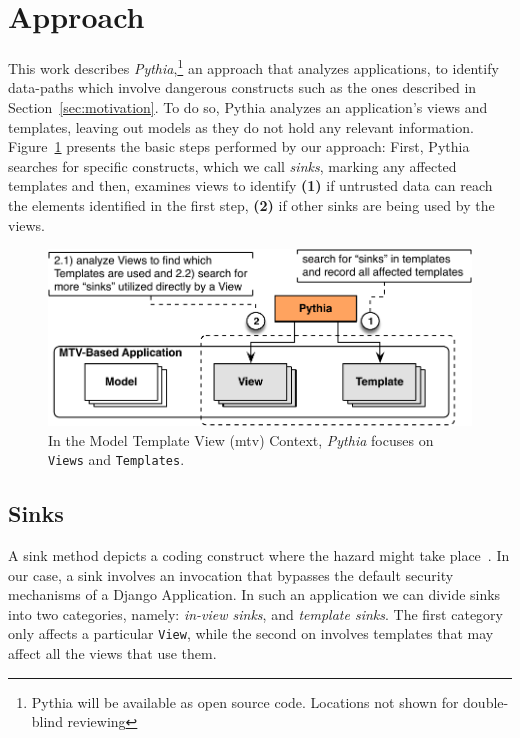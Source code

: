\section{Approach}
\label{sec:approach}

This work describes {\it Pythia},\footnote{Pythia
will be available as open source code.
Locations not shown for double-blind reviewing}
an approach that analyzes applications,
to identify data-paths
which involve dangerous constructs such
as the ones described in Section~\ref{sec:motivation}.
To do so,
Pythia analyzes an application's
views and templates,
leaving out models as they do not hold any relevant information.
Figure~\ref{fig:arch} presents the basic steps performed by our approach:
First,
Pythia searches for specific constructs,
which we call {\it sinks},
marking any affected templates and then,
examines views to identify
\textbf{(1)} if untrusted data can reach
the elements identified in the first step,
\textbf{(2)} if other sinks are being used by the views.

\begin{figure}[t]
    \begin{center}
        \includegraphics[scale=0.53]{MVC_and_Pythia_2.pdf}
        \caption{In the Model Template View ({\sc mtv}) Context, {\it Pythia} focuses on {\tt Views} and {\tt Templates}.}\label{fig:arch}
    \end{center}
\end{figure}

\subsection{Sinks}
\label{sec:sinks}

A sink method depicts a coding construct
where the hazard might take place~\cite{MLPK17}.
In our case,
a sink involves an invocation that bypasses
the default security mechanisms of a Django
Application.
In such an application we can divide sinks
into two categories,
namely:
{\it in-view sinks},
and {\it template sinks}.
The first category
only affects a particular {\tt View},
while the second on involves templates
that may affect all the views that use them. 

